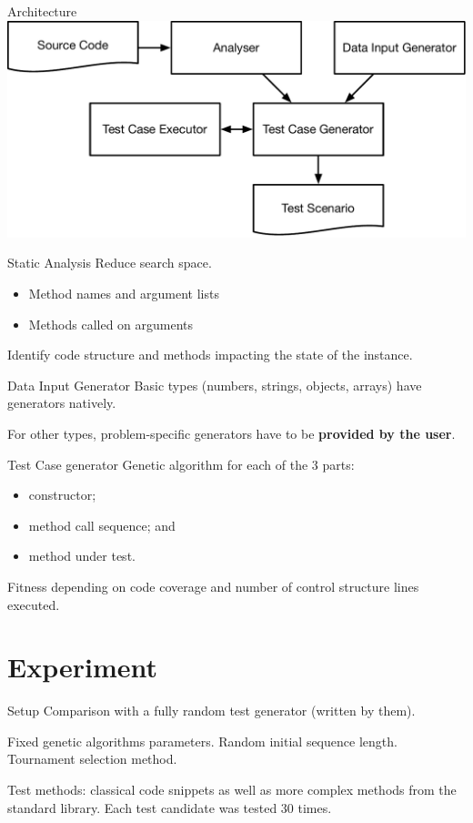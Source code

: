 \documentclass{beamer}
\begin{document}
\begin{frame}{Architecture}
  \includegraphics[width=\textwidth]{ruteg_arch}
\end{frame}

\begin{frame}{Static Analysis}
  Reduce search space.
  \begin{itemize}
    \item Method names and argument lists
    \item Methods called on arguments
  \end{itemize}

  Identify code structure and methods impacting the state of the instance.
\end{frame}

\begin{frame}{Data Input Generator}
  Basic types (numbers, strings, objects, arrays) have generators natively.

  For other types, problem-specific generators have to be \textbf{provided by the user}.
\end{frame}

\begin{frame}{Test Case generator}
  Genetic algorithm for each of the 3 parts:
  \begin{itemize}
    \item constructor;
    \item method call sequence; and
    \item method under test.
  \end{itemize}

  Fitness depending on code coverage and number of control structure lines executed.
\end{frame}


\section{Experiment}
\begin{frame}{Setup}
  Comparison with a fully random test generator (written by them).

  Fixed genetic algorithms parameters. Random initial sequence length. Tournament selection method.

  Test methods: classical code snippets as well as more complex methods from the standard library. Each test candidate was tested 30 times.
\end{frame}
\end{document}
